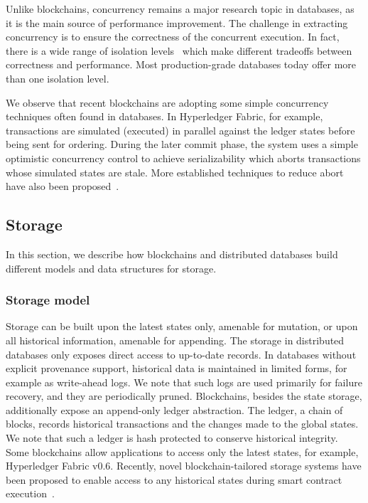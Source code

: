 Unlike blockchains, concurrency remains a major research topic in databases, as
it is the main source of performance improvement. The challenge in extracting
concurrency is to ensure the correctness of the concurrent execution. In fact,
there is a wide range of isolation
levels~\cite{computer1986american,bailis2013highly} which make different
tradeoffs between correctness and performance. Most production-grade databases
today offer more than one isolation level.

We observe that recent blockchains are adopting some simple concurrency
techniques often found in databases. In Hyperledger Fabric, for example,
transactions are simulated (executed) in parallel against the ledger states
before being sent for ordering. During the later commit phase, the system uses a
simple optimistic concurrency control to achieve serializability which aborts
transactions whose simulated states are stale. More established techniques to
reduce abort have also been proposed~\cite{sharma2019blurring,
ruan2020transactional}.

\subsection{Storage}

In this section, we describe how blockchains and distributed databases build
different models and data structures for storage.

\subsubsection{Storage model}
Storage can be built upon the latest states only, amenable for mutation, or upon
all historical information, amenable for appending.
The storage in distributed databases only exposes direct access to up-to-date
records. In databases without explicit provenance support, historical data is
maintained in limited forms, for example as write-ahead logs.
We note that such logs are used primarily for failure recovery, and they are
periodically pruned.
Blockchains, besides the state storage, additionally expose an append-only
ledger abstraction.
The ledger, a chain of blocks, records historical transactions and the changes
made to the global states.
We note that such a ledger is hash protected to conserve historical integrity.
Some blockchains allow applications to access only the latest states, for
example, Hyperledger Fabric v0.6.
Recently, novel blockchain-tailored storage systems have been proposed to enable
access to any historical states during smart contract
execution~\cite{ruan2019fine}.

